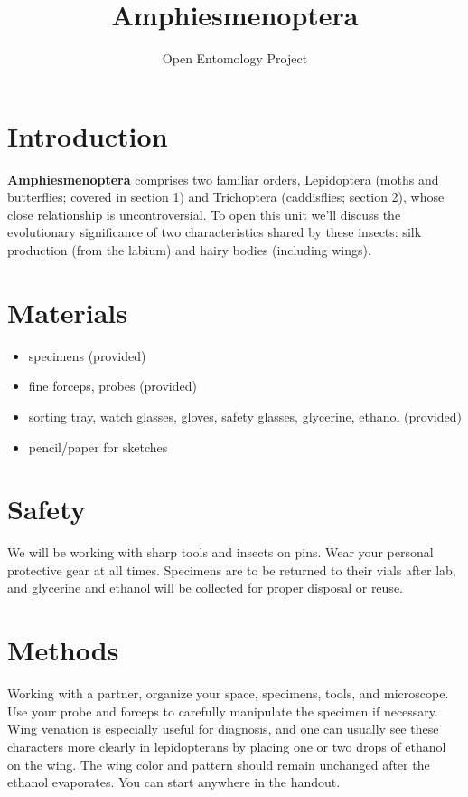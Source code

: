 \documentclass[letterpaper, 11pt]{article}
\title{Amphiesmenoptera}
\author{Open Entomology Project}
\begin{document}
\cleanlookdateon %
\maketitle
\thispagestyle{fancy}

\section*{Introduction}
\textbf{Amphiesmenoptera} comprises two familiar orders, Lepidoptera (moths and butterflies; covered in section 1) and Trichoptera (caddisflies; section 2), whose close relationship is uncontroversial. To open this unit we'll discuss the evolutionary significance of two characteristics shared by these insects: silk production (from the labium) and hairy bodies (including wings).


\section*{Materials}
\begin{itemize}
\item specimens (provided)
\item fine forceps, probes (provided)
\item sorting tray, watch glasses, gloves, safety glasses, glycerine, ethanol (provided)
\item pencil/paper for sketches
\end{itemize}

\section*{Safety}
We will be working with sharp tools and insects on pins. Wear your personal protective gear at all times. Specimens are to be returned to their vials after lab, and glycerine and ethanol will be collected for proper disposal or reuse.

\section*{Methods}
Working with a partner, organize your space, specimens, tools, and microscope. Use your probe and forceps to carefully manipulate the specimen if necessary. Wing venation is especially useful for diagnosis, and one can usually see these characters more clearly in lepidopterans by placing one or two drops of ethanol on the wing. The wing color and pattern should remain unchanged after the ethanol evaporates. You can start anywhere in the handout.
\end{document}
